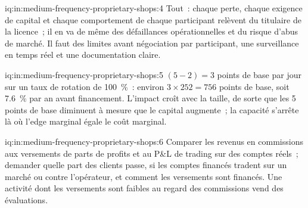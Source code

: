 \begin{solution}{iq:in:medium-frequency-proprietary-shops:4}
Tout~: chaque perte, chaque exigence de capital et chaque comportement de chaque participant relèvent du titulaire de la licence~; il en va de même des défaillances opérationnelles
et du risque d'abus de marché. Il faut des limites avant négociation par participant, une surveillance en temps réel et une documentation claire.
\end{solution}

\begin{solution}{iq:in:medium-frequency-proprietary-shops:5}
$(5-2)=3$ points de base par jour sur un taux de rotation de 100~\%~: environ $3\times252=756$ points de base, soit 7.6~\% par an avant financement. L'impact
croît avec la taille, de sorte que les 5 points de base diminuent à mesure que le capital augmente~; la capacité s'arrête là où l'edge marginal égale le coût marginal.
\end{solution}

\begin{solution}{iq:in:medium-frequency-proprietary-shops:6}
Comparer les revenus en commissions aux versements de parts de profits et au P\&L de trading sur des comptes réels~; demander quelle part des clients passe,
si les comptes financés tradent sur un marché ou contre l'opérateur, et comment les versements sont financés. Une activité dont les versements
sont faibles au regard des commissions vend des évaluations.
\end{solution}
